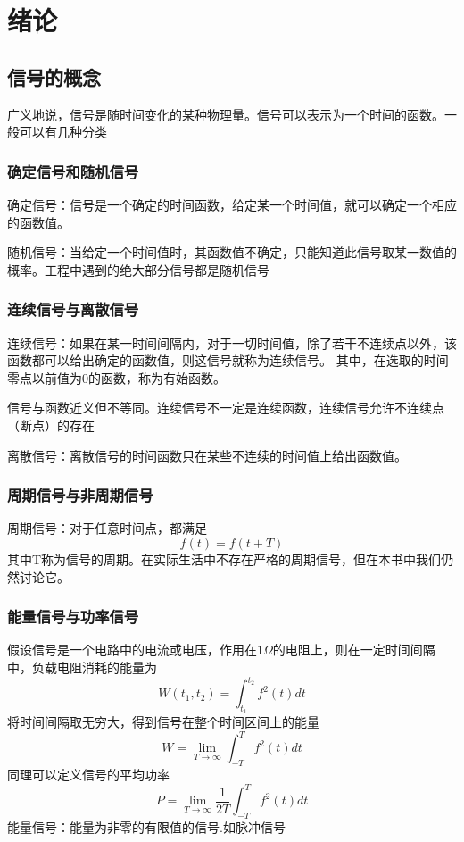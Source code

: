 \chapter{绪论}
\section{信号的概念}
广义地说，信号是随时间变化的某种物理量。信号可以表示为一个时间的函数。一般可以有几种分类
\subsection{确定信号和随机信号}
确定信号：信号是一个确定的时间函数，给定某一个时间值，就可以确定一个相应的函数值。

随机信号：当给定一个时间值时，其函数值不确定，只能知道此信号取某一数值的概率。工程中遇到的绝大部分信号都是随机信号
\subsection{连续信号与离散信号}
连续信号：如果在某一时间间隔内，对于一切时间值，除了若干不连续点以外，该函数都可以给出确定的函数值，则这信号就称为连续信号。
其中，在选取的时间零点以前值为0的函数，称为有始函数。

{\color{red}信号与函数近义但不等同。连续信号不一定是连续函数，连续信号允许不连续点（断点）的存在}

离散信号：离散信号的时间函数只在某些不连续的时间值上给出函数值。
\subsection{周期信号与非周期信号}
周期信号：对于任意时间点，都满足
\begin{equation}
    f(t)=f(t+T)
\end{equation}
其中T称为信号的周期。在实际生活中不存在严格的周期信号，但在本书中我们仍然讨论它。
\subsection{能量信号与功率信号}
假设信号是一个电路中的电流或电压，作用在$1\Omega$的电阻上，则在一定时间间隔中，负载电阻消耗的能量为
\begin{equation}
    W(t_1,t_2)=\int_{t_1}^{t_2}f^2(t)dt
\end{equation}
将时间间隔取无穷大，得到信号在整个时间区间上的能量
\begin{equation}
    W=\lim_{T\to \infty}\int_{-T}^{T}f^2(t)dt
\end{equation}
同理可以定义信号的平均功率
\begin{equation}
    P=\lim_{T\to \infty}\dfrac{1}{2T}\int_{-T}^{T}f^2(t)dt
\end{equation}
能量信号：能量为非零的有限值的信号.如脉冲信号

